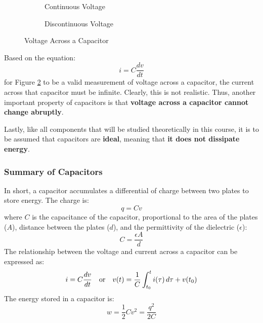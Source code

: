 \documentclass[12pt]{article}
\begin{document}
\begin{figure}[H]
  \vspace{-10pt}
  \begin{subfigure}[H]{0.45\textwidth}
    \centering
    
    \caption{Continuous Voltage}
    \label{fig:006}
  \end{subfigure}
  \begin{subfigure}[H]{0.45\textwidth}
    \centering
    
    \caption{Discontinuous Voltage}
    \label{fig:007}
  \end{subfigure}
  \caption{Voltage Across a Capacitor}
  \label{fig:voltageAcrossACapacitor}
\end{figure}

Based on the equation:
\begin{equation*}
  i = C \frac{dv}{dt}
\end{equation*}
for Figure \ref{fig:007} to be a valid measurement of voltage across a capacitor, the current across that capacitor must be infinite. Clearly, this is not realistic. Thus, another important property of capacitors is that \textbf{voltage across a capacitor cannot change abruptly}.

Lastly, like all components that will be studied theoretically in this course, it is to be assumed that capacitors are \textbf{ideal}, meaning that \textbf{it does not dissipate energy}.

\subsubsection{Summary of Capacitors}
\label{sssec:summaryOfCapacitors}

In short, a capacitor accumulates a differential of charge between two plates to store energy. The charge is:
\begin{equation*}
  q = Cv
\end{equation*}
where $C$ is the capacitance of the capacitor, proportional to the area of the plates ($A$), distance between the plates ($d$), and the permittivity of the dielectric ($\epsilon$):
\begin{equation*}
  C = \frac{\epsilon A}{d}
\end{equation*}
The relationship between the voltage and current across a capacitor can be expressed as:
\begin{equation*}
  i = C \frac{dv}{dt}\ \ \ \textup{or}\ \ \ v(t) = \frac{1}{C}\int_{t_0}^{t} i(\tau) \,d \tau + v(t_0)
\end{equation*}
The energy stored in a capacitor is:
\begin{equation*}
  w = \frac{1}{2}Cv^2 = \frac{q^2}{2C}
\end{equation*}
\end{document}
